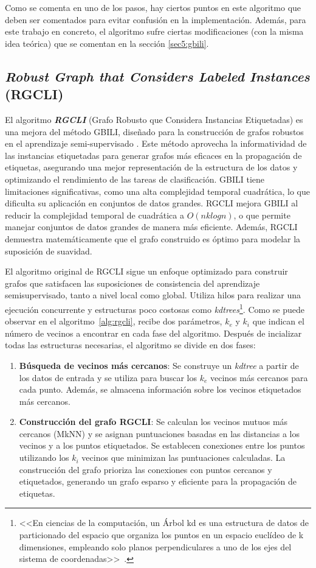 Como se comenta en uno de los pasos, hay ciertos puntos en este algoritmo que deben ser comentados para evitar confusión en la implementación. Además, para este trabajo en concreto, el algoritmo sufre ciertas modificaciones (con la misma idea teórica) que se comentan en la sección \ref{sec5:gbili}.
\clearpage
\subsection{\textit{Robust Graph that Considers Labeled Instances} (RGCLI)}\label{sec3:rgcli}
El algoritmo \textbf{\textit{RGCLI}} (Grafo Robusto que Considera Instancias Etiquetadas) es una mejora del método GBILI, diseñado para la construcción de grafos robustos en el aprendizaje semi-supervisado \cite{rgcli}. Este método aprovecha la informatividad de las instancias etiquetadas para generar grafos más eficaces en la propagación de etiquetas, asegurando una mejor representación de la estructura de los datos y optimizando el rendimiento de las tareas de clasificación. GBILI tiene limitaciones significativas, como una alta complejidad temporal cuadrática, lo que dificulta su aplicación en conjuntos de datos grandes. RGCLI mejora GBILI al reducir la complejidad temporal de cuadrática a $O(nklogn)$, o que permite manejar conjuntos de datos grandes de manera más eficiente. Además, RGCLI demuestra matemáticamente que el grafo construido es óptimo para modelar la suposición de suavidad.

El algoritmo original de RGCLI sigue un enfoque optimizado para construir grafos que satisfacen las suposiciones de consistencia del aprendizaje semisupervisado, tanto a nivel local como global. Utiliza hilos para realizar una ejecución concurrente y estructuras poco costosas como \textit{kdtrees}\footnote{<<En ciencias de la computación, un Árbol kd es una estructura de datos de particionado del espacio que organiza los puntos en un espacio euclídeo de k dimensiones, empleando solo planos perpendiculares a uno de los ejes del sistema de coordenadas>>~\cite{eswiki:kdtree}.}. Como se puede observar en el algoritmo~\ref{alg:rgcli}, recibe dos parámetros, $k_e$ y $k_i$ que indican el número de vecinos a encontrar en cada fase del algoritmo. Después de incializar todas las estructuras necesarias, el algoritmo se divide en dos fases:
\begin{enumerate}
	\item \textbf{Búsqueda de vecinos más cercanos}: Se construye un \textit{kdtree} a partir de los datos de entrada y se utiliza para buscar los $k_e$ vecinos más cercanos para cada punto. Además, se almacena información sobre los vecinos etiquetados más cercanos.
	\item \textbf{Construcción del grafo RGCLI}: Se calculan los vecinos mutuos más cercanos (MkNN) y se asignan puntuaciones basadas en las distancias a los vecinos y a los puntos etiquetados. Se establecen conexiones entre los puntos utilizando los $k_i$ vecinos que minimizan las puntuaciones calculadas. La construcción del grafo prioriza las conexiones con puntos cercanos y etiquetados, generando un grafo esparso y eficiente para la propagación de etiquetas.
\end{enumerate}

